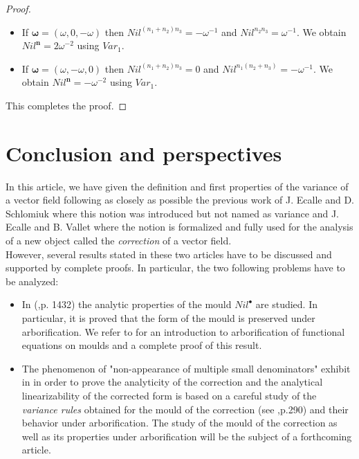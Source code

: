 \documentclass[english,11pt]{amsart}
\def\nn{\mathbf{n}}
\def\nn{\mathbf{n}}
\def\oo{\boldsymbol\omega}
\begin{document}
\begin{proof}
\begin{itemize}
    \item If $\oo =(\omega ,0,-\omega )$ then $Nil^{(n_1 +n_2 ) n_3 } = -\omega^{-1}$ and $Nil^{n_2 n_3} = \omega^{-1}$. We obtain $Nil^{\nn} = 2\omega^{-2}$ using $Var_1$.

    \item If $\oo =(\omega , -\omega ,0 )$ then $Nil^{(n_1 +n_2 ) n_3} = 0$ and $ Nil^{n_1 (n_2 +n_3 )} = -\omega^{-1}$. We obtain $Nil^{\nn} = -\omega^{-2}$ using $Var_1$. 
\end{itemize}
This completes the proof.



\end{proof}

\section{Conclusion and perspectives}
\label{conclusion}

In this article, we have given the definition and first properties of the variance of a vector field following as closely as possible the previous work of J. Ecalle and D. Schlomiuk \cite{es} where this notion was introduced but not named as variance and J. Ecalle and B. Vallet \cite{ev} where the notion is formalized and fully used for the analysis of a new object called the {\it correction} of a vector field. \\

However, several results stated in these two articles have to be discussed and supported by complete proofs. In particular, the two following problems have to be analyzed:\\

\begin{itemize}
\item In (\cite{es},p. 1432) the analytic properties of the mould $Nil^{\bullet}$ are studied. In particular, it is proved that the form of the mould is preserved under arborification. We refer to \cite{cmp} for an introduction to arborification of functional equations on moulds and a complete proof of this result. \\

\item The phenomenon of "non-appearance of multiple small denominators" exhibit in \cite{ev} in order to prove the analyticity  of the correction and the analytical linearizability of the corrected form is based on a careful study of the {\it variance rules} obtained for the mould of the correction (see \cite{ev},p.290) and their behavior under arborification. The study of the mould of the correction as well as its properties under arborification will be the subject of a forthcoming article.
\end{itemize}
\end{document}
